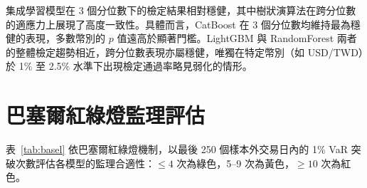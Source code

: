 集成學習模型在 3 個分位數下的檢定結果相對穩健，其中樹狀演算法在跨分位數的適應力上展現了高度一致性。具體而言，CatBoost 在 3 個分位數均維持最為穩健的表現，多數幣別的 $p$ 值遠高於顯著門檻。LightGBM 與 RandomForest 兩者的整體檢定趨勢相近，跨分位數表現亦屬穩健，唯獨在特定幣別（如 USD/TWD）於 1\% 至 2.5\% 水準下出現檢定通過率略見弱化的情形。


\section{巴塞爾紅綠燈監理評估}
\label{sec:basel_assessment}

表~\ref{tab:basel} 依巴塞爾紅綠燈機制，以最後 250 個樣本外交易日內的 1\% VaR 突破次數評估各模型的監理合適性：$\leq 4$ 次為綠色，5–9 次為黃色，$\geq 10$ 次為紅色。

